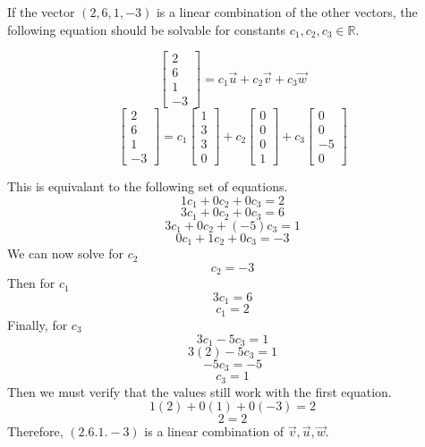 \documentclass{article}
\begin{document}
If the vector $(2,6,1,-3)$ is a linear combination of the other vectors, the following equation should be solvable for constants $c_{1},c_{2},c_{3}\in \mathbb{R}$.

\[\begin{bmatrix} 2 \\ 6 \\ 1 \\ -3 \end{bmatrix} = c_{1}\vec{u} + c_{2}\vec{v} + c_{3}\vec{w}\]
\[\begin{bmatrix} 2 \\ 6 \\ 1 \\ -3 \end{bmatrix} = c_{1}\begin{bmatrix} 1 \\ 3 \\ 3 \\ 0 \end{bmatrix} + c_{2} \begin{bmatrix} 0 \\ 0 \\ 0 \\ 1 \end{bmatrix} + c_{3}\begin{bmatrix}0 \\ 0 \\ -5 \\ 0 \end{bmatrix}\]

This is equivalant to the following set of equations.
\[1c_{1}+0c_{2}+0c_{3}=2\]
\[3c_{1}+0c_{2}+0c_{3}=6\]
\[3c_{1}+0c_{2}+(-5)c_{3}=1\]
\[0c_{1}+1c_{2}+0c_{3}=-3\]
We can now solve for $c_{2}$
\[c_{2}=-3\]
Then for $c_{1}$
\[3c_{1}=6\]
\[c_{1}=2\]
Finally, for $c_{3}$
\[3c_{1}-5c_{3}=1\]
\[3(2)-5c_{3}=1\]
\[-5c_{3}=-5\]
\[c_{3}=1\]
Then we must verify that the values still work with the first equation.
\[1(2)+0(1)+0(-3)=2\]
\[2 = 2\]
Therefore, $(2.6.1.-3)$ is a linear combination of $\vec{v}, \vec{u}, \vec{w}$.
\end{document}

